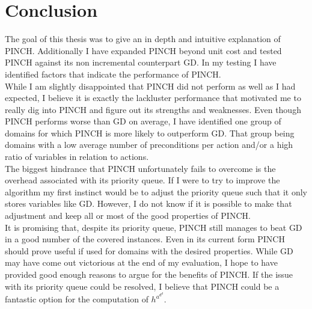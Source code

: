 \chapter{Conclusion}
The goal of this thesis was to give an in depth and intuitive explanation of PINCH. Additionally I have expanded PINCH beyond unit cost and tested PINCH against its non incremental counterpart GD. In my testing I have identified factors that indicate the performance of PINCH.\\

While I am slightly disappointed that PINCH did not perform as well as I had expected, I believe it is exactly the lackluster performance that motivated me to really dig into PINCH and figure out its strengths and weaknesses. Even though PINCH performs worse than GD on average, I have identified one group of domains for which PINCH is more likely to outperform GD. That group being domains with a low average number of preconditions per action and/or a high ratio of variables in relation to actions.\\

The biggest hindrance that PINCH unfortunately fails to overcome is the overhead associated with its priority queue. If I were to try to improve the algorithm my first instinct would be to adjust the priority queue such that it only stores variables like GD. However, I do not know if it is possible to make that adjustment and keep all or most of the good properties of PINCH.\\

It is promising that, despite its priority queue, PINCH still manages to beat GD in a good number of the covered instances. Even in its current form PINCH should prove useful if used for domains with the desired properties. While GD may have come out victorious at the end of my evaluation, I hope to have provided good enough reasons to argue for the benefits of PINCH. If the issue with its priority queue could be resolved, I believe that PINCH could be a fantastic option for the computation of $h^a^d^d$.